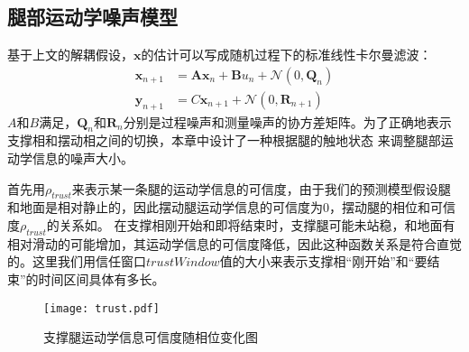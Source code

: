 \subsection{腿部运动学噪声模型}
\label{sec:leg_noise}
基于上文的解耦假设，$\boldsymbol{x}$的估计可以写成随机过程下的标准线性卡尔曼滤波：
\begin{equation}
    \label{equ:std_kf}
    \begin{aligned}
        \boldsymbol{x}_{n+1} & =\boldsymbol{A} \boldsymbol{x}_n+\boldsymbol{B} u_n+\mathcal{N}\left(0, \boldsymbol{Q}_n\right) \\
        \boldsymbol{y}_{n+1} & =C \boldsymbol{x}_{n+1}+\mathcal{N}\left(0, \boldsymbol{R}_{n+1}\right)
        \end{aligned}
\end{equation}
$A$和$B$满足，$\boldsymbol{Q}_n$和$\boldsymbol{R}_n$分别是过程噪声和测量噪声的协方差矩阵。为了正确地表示支撑相和摆动相之间的切换，本章中设计了一种根据腿的触地状态
来调整腿部运动学信息的噪声大小。

首先用$\rho_{trust}$来表示某一条腿的运动学信息的可信度，由于我们的预测模型假设腿和地面是相对静止的，因此摆动腿运动学信息的可信度为0，摆动腿的相位和可信度$\rho_{trust}$的关系如。
在支撑相刚开始和即将结束时，支撑腿可能未站稳，和地面有相对滑动的可能增加，其运动学信息的可信度降低，因此这种函数关系是符合直觉的。这里我们用信任窗口$trustWindow$值的大小来表示支撑相“刚开始”和“要结束”的时间区间具体有多长。
\begin{figure}[h]
    \centering
    \texttt{[image: trust.pdf]}
    \caption{\label{fig:kin_trust}支撑腿运动学信息可信度随相位变化图}
\end{figure}

